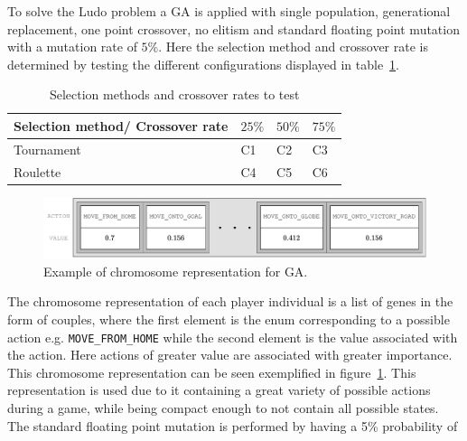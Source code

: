 To solve the Ludo problem a GA is applied with single population, generational replacement, 
one point crossover, no elitism and 
standard floating point mutation with a mutation rate of $5\%$.
Here the selection method and crossover rate is determined by testing the different configurations displayed
in table~\ref{tab:configs}.
\vspace*{-0.2cm}
\begin{table}
	\begin{small}
		\begin{center}
			\caption{Selection methods and crossover rates to test}
			\label{tab:configs}
			\begin{tabular}[c]{|l|l|l|l|}
				\hline
				 Selection method/ Crossover rate & $25\%$ & $50\%$ & $75\%$  \\ \hline
				 Tournament                      &  C1      &    C2    & C3 \\ \hline
				 Roulette                        &  C4      &    C5    & C6 \\
				\hline
			\end{tabular}
		\end{center}
	\end{small}
\end{table}
\begin{figure}
		\begin{center}
			\includegraphics[width=\textwidth]{fig/genome_rep_list.drawio.pdf}
		\end{center}
		\caption{Example of chromosome representation for GA.}
		\label{fig:chromosome_rep}
\end{figure}
The chromosome representation of each player individual is a list of genes in the form of couples, where the 
first element is the enum corresponding to a possible action e.g. \texttt{MOVE\_FROM\_HOME}
while the second element is the value associated with the action. Here actions of greater value
are associated with greater importance. This chromosome representation can be seen exemplified in figure~\ref{fig:chromosome_rep}.
This representation is used due to it containing a great variety of possible actions
during a game, while being compact enough to not contain all possible states.
The standard floating point mutation is performed by having a 5\% probability of
